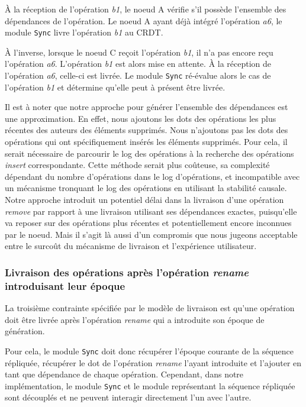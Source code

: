 À la réception de l'opération \emph{b1}, le noeud A vérifie s'il possède l'ensemble des dépendances de l'opération.
Le noeud A ayant déjà intégré l'opération \emph{a6}, le module \texttt{Sync} livre l'opération \emph{b1} au \ac{CRDT}.

À l'inverse, lorsque le noeud C reçoit l'opération \emph{b1}, il n'a pas encore reçu l'opération \emph{a6}.
L'opération \emph{b1} est alors mise en attente.
À la réception de l'opération \emph{a6}, celle-ci est livrée.
Le module \texttt{Sync} ré-évalue alors le cas de l'opération \emph{b1} et détermine qu'elle peut à présent être livrée.

Il est à noter que notre approche pour générer l'ensemble des dépendances est une approximation.
En effet, nous ajoutons les dots des opérations les plus récentes des auteurs des éléments supprimés.
Nous n'ajoutons pas les dots des opérations qui ont spécifiquement insérés les éléments supprimés.
Pour cela, il serait nécessaire de parcourir le log des opérations à la recherche des opérations \emph{insert} correspondante.
Cette méthode serait plus coûteuse, sa complexité dépendant du nombre d'opérations dans le log d'opérations, et incompatible avec un mécanisme tronquant le log des opérations en utilisant la stabilité causale.
Notre approche introduit un potentiel délai dans la livraison d'une opération \emph{remove} par rapport à une livraison utilisant ses dépendances exactes, puisqu'elle va reposer sur des opérations plus récentes et potentiellement encore inconnues par le noeud.
Mais il s'agit là aussi d'un compromis que nous jugeons acceptable entre le surcoût du mécanisme de livraison et l'expérience utilisateur.

\subsubsection{Livraison des opérations après l'opération \emph{rename} introduisant leur époque}

La troisième contrainte spécifiée par le modèle de livraison est qu'une opération doit être livrée après l'opération \emph{rename} qui a introduite son époque de génération.

Pour cela, le module \texttt{Sync} doit donc récupérer l'époque courante de la séquence répliquée, récupérer le dot de l'opération \emph{rename} l'ayant introduite et l'ajouter en tant que dépendance de chaque opération.
Cependant, dans notre implémentation, le module \texttt{Sync} et le module représentant la séquence répliquée sont découplés et ne peuvent interagir directement l'un avec l'autre.

